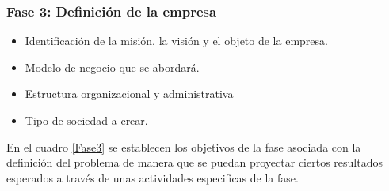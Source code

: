 \subsubsection{Fase 3: Definición de la empresa}
\begin{itemize}
    \item Identificación de la misión, la visión y el objeto de la empresa.
    \item Modelo de negocio que se abordará.
    \item Estructura organizacional y administrativa
    \item Tipo de sociedad a crear.
\end{itemize}
En el cuadro \ref{Fase3} se establecen los objetivos de la fase asociada con la definición del problema de manera que se puedan proyectar ciertos resultados esperados a través de unas actividades especificas de la fase.
\begin{adjustbox}{
            center,
             caption=[{Descripción de la fase 3}]{\centering Descripción de la fase 3.},
            label={Fase3},
            nofloat=table, , vspace={20px}}

 \end{adjustbox}
        

